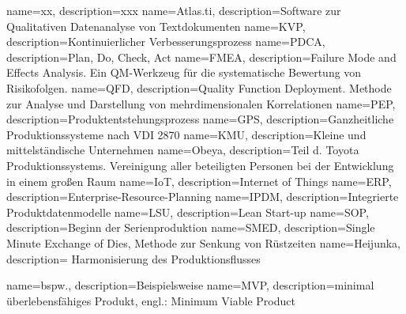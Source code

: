 %
{
  name=xx, 
  description={xxx}
}
%
%
{
  name=Atlas.ti, 
  description={Software zur Qualitativen Datenanalyse von Textdokumenten}
}
%
%
{
  name=KVP, 
  description={Kontinuierlicher Verbesserungsprozess}
}
%
%
{
  name=PDCA, 
  description={Plan, Do, Check, Act}
}
%
%
{
  name=FMEA, 
  description={Failure Mode and Effects Analysis. Ein QM-Werkzeug für die systematische Bewertung von Risikofolgen.}
}
%
%
{
  name=QFD, 
  description={Quality Function Deployment. Methode zur Analyse und Darstellung von mehrdimensionalen Korrelationen}
}
%
%
{
  name=PEP, 
  description={Produktentstehungsprozess}
}
%
%
{
  name=GPS, 
  description={Ganzheitliche Produktionssysteme nach VDI 2870}
}
%
%
{
  name=KMU, 
  description={Kleine und mittelständische Unternehmen}
}
%
%
{
  name=Obeya, 
  description={Teil d. Toyota Produktionssystems. Vereinigung aller beteiligten Personen bei der Entwicklung in einem großen Raum}
}
%
{
  name=IoT, 
  description={Internet of Things}
}
%
%
{
  name=ERP, 
  description={Enterprise-Resource-Planning}
}
%
{
  name=IPDM, 
  description={Integrierte Produktdatenmodelle}
}
%
{
  name=LSU, 
  description={Lean Start-up}
}
%
{
  name=SOP, 
  description={Beginn der Serienproduktion}
}
%
{
  name=SMED, 
  description={Single Minute Exchange of Dies, Methode zur Senkung von Rüstzeiten}
}
%
{
  name=Heijunka, 
  description={
Harmonisierung des Produktionsflusses}
}

{
  name=bspw.,
  description={Beispielsweise}
}
%
{  
  name=MVP,
  description={minimal überlebensfähiges Produkt, engl.: Minimum Viable
Product}
}
